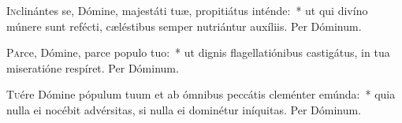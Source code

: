 \documentclass[vesperale_romanum.tex]{subfiles}
\begin{document}


\oratio

\lettrine{I}{n}clinántes se, Dómine, majestáti tuæ, propitiátus inténde:~* ut qui divíno múnere sunt refécti, cæléstibus semper nutriántur auxíliis. Per Dóminum.



\oratio

\lettrine{P}{a}rce, Dómine, parce populo tuo:~* ut dignis flagellatiónibus castigátus, in tua miseratióne respíret. Per Dóminum.



\oratio

\lettrine{T}{u}ére Dómine pópulum tuum et ab ómnibus peccátis cleménter emúnda:~* quia nulla ei nocébit advérsitas, si nulla ei dominétur iníquitas.
Per Dóminum.

\biggerrule
\end{document}
